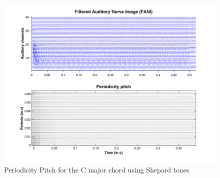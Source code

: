 \begin{figure}[h]
    \centering
    \includegraphics[width=\IPEMDefaultFigureWidth]{Graphics/ShepardCChordPeriodicityPitch}
    \caption{Periodicity Pitch for the C major chord using Shepard tones}
    \label{Fig:ShepardCChordPeriodicityPitch}
\end{figure}
